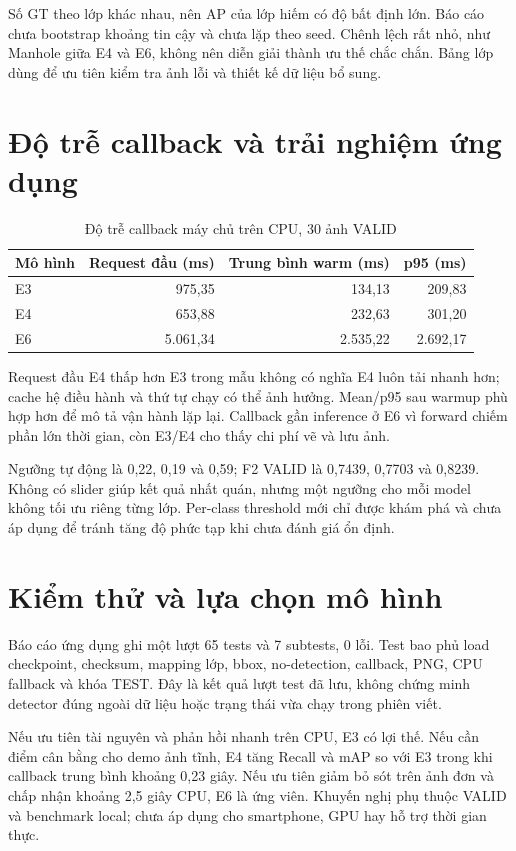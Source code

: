 \documentclass[12pt,a4paper,oneside]{report}
\begin{document}
Số GT theo lớp khác nhau, nên AP của lớp hiếm có độ bất định lớn. Báo cáo chưa bootstrap khoảng tin cậy và chưa lặp theo seed. Chênh lệch rất nhỏ, như Manhole giữa E4 và E6, không nên diễn giải thành ưu thế chắc chắn. Bảng lớp dùng để ưu tiên kiểm tra ảnh lỗi và thiết kế dữ liệu bổ sung.

\section{Độ trễ callback và trải nghiệm ứng dụng}
\begin{table}[H]\centering\small
\caption{Độ trễ callback máy chủ trên CPU, 30 ảnh VALID}\label{tab:server}
\begin{tabular}{lrrr}\toprule
Mô hình & Request đầu (ms) & Trung bình warm (ms) & p95 (ms)\\\midrule
E3 & 975,35 & 134,13 & 209,83\\
E4 & 653,88 & 232,63 & 301,20\\
E6 & 5.061,34 & 2.535,22 & 2.692,17\\\bottomrule
\end{tabular}
\end{table}

Request đầu E4 thấp hơn E3 trong mẫu không có nghĩa E4 luôn tải nhanh hơn; cache hệ điều hành và thứ tự chạy có thể ảnh hưởng. Mean/p95 sau warmup phù hợp hơn để mô tả vận hành lặp lại. Callback gần inference ở E6 vì forward chiếm phần lớn thời gian, còn E3/E4 cho thấy chi phí vẽ và lưu ảnh.

Ngưỡng tự động là 0,22, 0,19 và 0,59; F2 VALID là 0,7439, 0,7703 và 0,8239. Không có slider giúp kết quả nhất quán, nhưng một ngưỡng cho mỗi model không tối ưu riêng từng lớp. Per-class threshold mới chỉ được khám phá và chưa áp dụng để tránh tăng độ phức tạp khi chưa đánh giá ổn định.

\section{Kiểm thử và lựa chọn mô hình}
Báo cáo ứng dụng ghi một lượt 65 tests và 7 subtests, 0 lỗi. Test bao phủ load checkpoint, checksum, mapping lớp, bbox, no-detection, callback, PNG, CPU fallback và khóa TEST. Đây là kết quả lượt test đã lưu, không chứng minh detector đúng ngoài dữ liệu hoặc trạng thái vừa chạy trong phiên viết.

Nếu ưu tiên tài nguyên và phản hồi nhanh trên CPU, E3 có lợi thế. Nếu cần điểm cân bằng cho demo ảnh tĩnh, E4 tăng Recall và mAP so với E3 trong khi callback trung bình khoảng 0,23 giây. Nếu ưu tiên giảm bỏ sót trên ảnh đơn và chấp nhận khoảng 2,5 giây CPU, E6 là ứng viên. Khuyến nghị phụ thuộc VALID và benchmark local; chưa áp dụng cho smartphone, GPU hay hỗ trợ thời gian thực.
\end{document}
